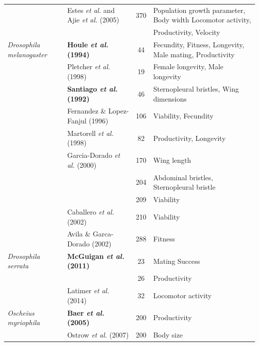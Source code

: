 \begin{table}[!h]
\begin{tabular}{llcl}
    & Estes \textit{et al.} and Ajie \textit{et al.} (2005) & 370 & Population growth parameter, Body width Locomotor activity, \\
    & & & Productivity, Velocity\\
    \midrule
\textit{Drosophila melanogaster }
    & \textbf{Houle \textit{et al.} (1994)} & 44 & Fecundity, Fitness, Longevity, Male mating, Productivity\\
    & Pletcher \textit{et al.} (1998) & 19 & Female longevity, Male longevity\\
    & \textbf{Santiago \textit{et al.} (1992)} & 46 & Sternopleural bristles, Wing dimensions\\
    & Fernandez \& Lopez-Fanjul (1996) & 106 & Viability, Fecundity \\
    & Martorell \textit{et al.} (1998) & 82 & Productivity, Longevity\\
    & Garcia-Dorado \textit{et al.} (2000) & 170 & Wing length\\
        & & 204 & Abdominal bristles, Sternopleural bristle\\
        & & 209 & Viability\\
    & Caballero \textit{et al.} (2002) & 210 & Viability\\
    & Avila \& Garca-Dorado (2002) & 288 & Fitness\\
    \midrule
\textit{Drosophila serrata }
    & \textbf{McGuigan \textit{et al.} (2011)} & 23 & Mating Success\\
    & & 26 & Productivity\\
    & Latimer \textit{et al.} (2014) & 32 & Locomotor activity \\
    \midrule
\textit{Oscheius myriophila }
    & \textbf{Baer \textit{et al.} (2005)} & 200 & Productivity \\
    & Ostrow \textit{et al.} (2007) & 200 & Body size \\
    \bottomrule
    \end{tabular}
    \label{tab:MetaNonIndepend}
\end{table}




